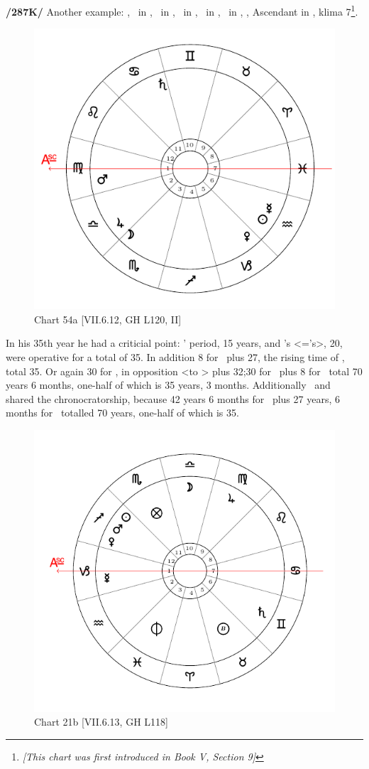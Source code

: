 \newpage
\textbf{/287K/} Another example: \Sun, \Mercury\, in \Aquarius, \Moon\, in \Scorpio, \Saturn\, in \Cancer, \Jupiter\, in \Libra, \Venus\, in \Capricorn, \Mars, Ascendant in \Virgo, klima 7\footnote{\textit{[This chart was first introduced in Book V, Section 9]}}.

\begin{figure}
\centering
\vspace{-20pt}
\includegraphics[width=.68\textwidth]{charts/5_09_1}
\caption{Chart 54a [VII.6.12, GH L120, II] }
\label{fig:chart54a}
\end{figure} 

In his 35th year he had a criticial point: \Mars’ period, 15 years, and \Virgo’s <=\Mercury’s>, 20, were operative for a total of 35. In addition 8 for \Venus\, plus 27, the rising time of \Capricorn, total 35. Or again 30 for \Saturn, in opposition <to \Venus>
plus 32;30 for \Cancer\, plus 8 for \Venus\, total 70 years 6 months, one-half of which is 35 years, 3 months. Additionally \Jupiter\, and \Saturn\, shared the chronocratorship, because 42 years 6 months for \Libra\, plus 27 years, 6 months for \Cancer\, totalled 70 years, one-half of which is 35.

\newpage
\begin{figure}
\centering
\includegraphics[width=.68\textwidth]{charts/7_6_13}
\caption{Chart 21b [VII.6.13, GH L118] }
\label{fig:chart21b}
\end{figure} 

